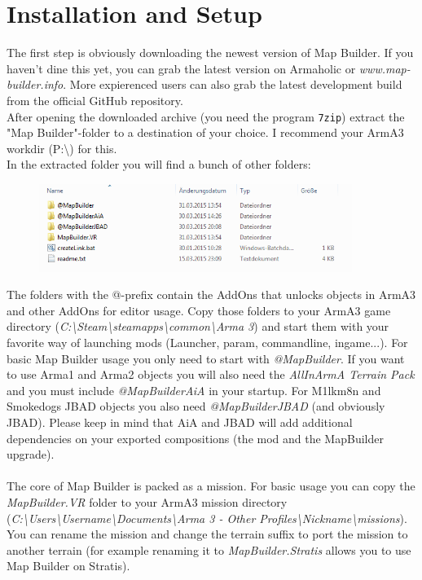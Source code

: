 \documentclass[english]{scrartcl}
\begin{document}
	\section{Installation and Setup}
	The first step is obviously downloading the newest version of Map Builder. If you haven't dine this yet, you can grab the latest version on Armaholic or \textit{www.map-builder.info}. More expierenced users can also grab the latest development build from the official GitHub repository.\\
	After opening the downloaded archive (you need the program \texttt{7zip}) extract the "Map Builder"-folder to a destination of your choice. I recommend your ArmA3 workdir (P:\textbackslash) for this.\\
	In the extracted folder you will find a bunch of other folders:
	\begin{figure}[hb]
		\centering
		\includegraphics[width=4in]{images/depacked.png}
	\end{figure}
	\FloatBarrier
	The folders with the @-prefix contain the AddOns that unlocks objects in ArmA3 and other AddOns for editor usage. Copy those folders to your ArmA3 game directory (\textit{C:\textbackslash Steam\textbackslash steamapps\textbackslash common\textbackslash Arma 3}) and start them with your favorite way of launching mods (Launcher, param, commandline, ingame...). For basic Map Builder usage you only need to start with \textit{@MapBuilder}. If you want to use Arma1 and Arma2 objects you will also need the \textit{AllInArmA Terrain Pack} and you must include \textit{@MapBuilderAiA} in your startup. For M1lkm8n and Smokedogs JBAD objects you also need \textit{@MapBuilderJBAD} (and obviously JBAD). Please keep in mind that AiA and JBAD will add additional dependencies on your exported compositions (the mod and the MapBuilder upgrade).\\
	\\
	The core of Map Builder is packed as a mission. For basic usage you can copy the \textit{MapBuilder.VR} folder to your ArmA3 mission directory (\textit{C:\textbackslash Users\textbackslash Username\textbackslash Documents\textbackslash Arma 3 - Other Profiles\textbackslash Nickname\textbackslash missions}). You can rename the mission and change the terrain suffix to port the mission to another terrain (for example renaming it to \textit{MapBuilder.Stratis} allows you to use Map Builder on Stratis).\\
\end{document}

